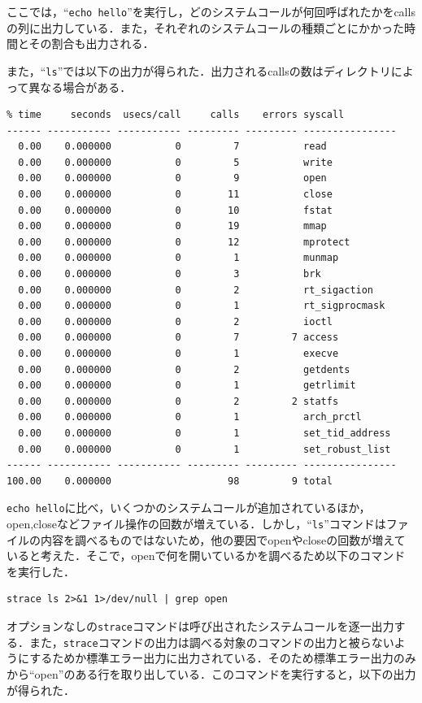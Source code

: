 \documentclass[a4j,10pt,titlepage]{jsarticle}
\begin{document}
ここでは，``\verb|echo hello|''を実行し，どのシステムコールが何回呼ばれたかをcallsの列に出力している．また，それぞれのシステムコールの種類ごとにかかった時間とその割合も出力される．

また，``\verb|ls|''では以下の出力が得られた．出力されるcallsの数はディレクトリによって異なる場合がある．
\begin{verbatim}
% time     seconds  usecs/call     calls    errors syscall
------ ----------- ----------- --------- --------- ----------------
  0.00    0.000000           0         7           read
  0.00    0.000000           0         5           write
  0.00    0.000000           0         9           open
  0.00    0.000000           0        11           close
  0.00    0.000000           0        10           fstat
  0.00    0.000000           0        19           mmap
  0.00    0.000000           0        12           mprotect
  0.00    0.000000           0         1           munmap
  0.00    0.000000           0         3           brk
  0.00    0.000000           0         2           rt_sigaction
  0.00    0.000000           0         1           rt_sigprocmask
  0.00    0.000000           0         2           ioctl
  0.00    0.000000           0         7         7 access
  0.00    0.000000           0         1           execve
  0.00    0.000000           0         2           getdents
  0.00    0.000000           0         1           getrlimit
  0.00    0.000000           0         2         2 statfs
  0.00    0.000000           0         1           arch_prctl
  0.00    0.000000           0         1           set_tid_address
  0.00    0.000000           0         1           set_robust_list
------ ----------- ----------- --------- --------- ----------------
100.00    0.000000                    98         9 total
\end{verbatim}

\verb|echo hello|に比べ，いくつかのシステムコールが追加されているほか，open,closeなどファイル操作の回数が増えている．しかし，``\verb|ls|''コマンドはファイルの内容を調べるものではないため，他の要因でopenやcloseの回数が増えていると考えた．そこで，openで何を開いているかを調べるため以下のコマンドを実行した．

\begin{verbatim}
strace ls 2>&1 1>/dev/null | grep open
\end{verbatim}

オプションなしの\verb|strace|コマンドは呼び出されたシステムコールを逐一出力する．また，\verb|strace|コマンドの出力は調べる対象のコマンドの出力と被らないようにするためか標準エラー出力に出力されている．そのため標準エラー出力のみから``open''のある行を取り出している．このコマンドを実行すると，以下の出力が得られた．
\end{document}
